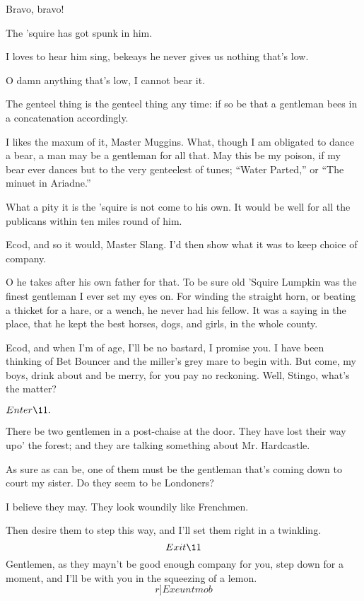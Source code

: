 \documentclass{book}
\begin{document}
  Bravo, bravo!

  The 'squire has got spunk in him.

  I loves to hear him sing, bekeays he never gives us
nothing that's low.

  O damn anything that's low, I cannot bear it.

  The genteel thing is the genteel thing any time: if so
be that a gentleman bees in a concatenation accordingly.

  I likes the maxum of it, Master Muggins.  What, though I
am obligated to dance a bear, a man may be a gentleman for all that. 
May this be my poison, if my bear ever dances but to the very
genteelest of tunes; ``Water Parted,'' or ``The minuet in Ariadne.''

  What a pity it is the 'squire is not come to his own. 
It would be well for all the publicans within ten miles round of him.

\5  Ecod, and so it would, Master Slang.  I'd then show what it was
to keep choice of company.

  O he takes after his own father for that.  To be sure
old 'Squire Lumpkin was the finest gentleman I ever set my eyes on. 
For winding the straight horn, or beating a thicket for a hare, or a
wench, he never had his fellow.  It was a saying in the place, that he
kept the best horses, dogs, and girls, in the whole county.

\5  Ecod, and when I'm of age, I'll be no bastard, I promise you.  I
have been thinking of Bet Bouncer and the miller's grey mare to begin
with.  But come, my boys, drink about and be merry, for you pay no
reckoning.  Well, Stingo, what's the matter?


\(Enter \11.\)


  There be two gentlemen in a post-chaise at the door.  They
have lost their way upo' the forest; and they are talking something
about Mr. Hardcastle.

\5  As sure as can be, one of them must be the gentleman that's
coming down to court my sister.  Do they seem to be Londoners?

  I believe they may.  They look woundily like Frenchmen.

\5  Then desire them to step this way, and I'll set them right in a
twinkling. \[Exit \11\]
Gentlemen, as they mayn't be good enough
company for you, step down for a moment, and I'll be with you in the
squeezing of a lemon.  \[r]Exeunt mob\]
\end{document}
